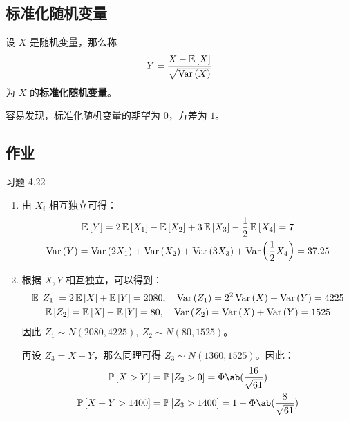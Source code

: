 \subsection{标准化随机变量}

\begin{definition}[标准化随机变量]
    设 $X$ 是随机变量，那么称
    $$
    Y = \frac{X - \operatorname{\mathbb{E}}\left[X\right]}{\sqrt{\operatorname{Var}\left(X\right)}}
    $$
    为 $X$ 的\textbf{标准化随机变量}。
\end{definition}

容易发现，标准化随机变量的期望为 $0$，方差为 $1$。

\subsection{作业}

\begin{problem}
    习题 4.22
    \begin{solution}
        \begin{enumerate}
            \item[\textbf{1)}] 由 $X_i$ 相互独立可得：
            $$
            \begin{gathered}
                \operatorname{\mathbb{E}}\left[Y\right] = 2 \operatorname{\mathbb{E}}\left[X_1\right] - \operatorname{\mathbb{E}}\left[X_2\right] + 3 \operatorname{\mathbb{E}}\left[X_3\right] - \frac{1}{2} \operatorname{\mathbb{E}}\left[X_4\right] = 7 \\
                \operatorname{Var}\left(Y\right) = \operatorname{Var}\left(2 X_1\right) + \operatorname{Var}\left(X_2\right) + \operatorname{Var}\left(3 X_3\right) + \operatorname{Var}\left(\frac{1}{2} X_4\right) = 37.25
            \end{gathered}
            $$
            \item[\textbf{2)}] 根据 $X, Y$ 相互独立，可以得到：
            $$
            \begin{gathered}
                \operatorname{\mathbb{E}}\left[Z_1\right] = 2 \operatorname{\mathbb{E}}\left[X\right] + \operatorname{\mathbb{E}}\left[Y\right] = 2080,\quad \operatorname{Var}\left(Z_1\right) = 2^2 \operatorname{Var}\left(X\right) + \operatorname{Var}\left(Y\right) = 4225 \\
                \operatorname{\mathbb{E}}\left[Z_2\right] = \operatorname{\mathbb{E}}\left[X\right] - \operatorname{\mathbb{E}}\left[Y\right] = 80,\quad \operatorname{Var}\left(Z_2\right) = \operatorname{Var}\left(X\right) + \operatorname{Var}\left(Y\right) = 1525
            \end{gathered}
            $$
            因此 $Z_1 \sim N(2080, 4225),\ Z_2 \sim N(80, 1525)$。

            再设 $Z_3 = X + Y$，那么同理可得 $Z_3 \sim N(1360, 1525)$。因此：
            $$
            \begin{gathered}
                \prob{X > Y} = \prob{Z_2 > 0} = \Phi\ab(\frac{16}{\sqrt{61}}) \\
                \prob{X + Y > 1400} = \prob{Z_3 > 1400} = 1 - \Phi\ab(\frac{8}{\sqrt{61}})
            \end{gathered}
            $$
        \end{enumerate}
    \end{solution}
\end{problem}

